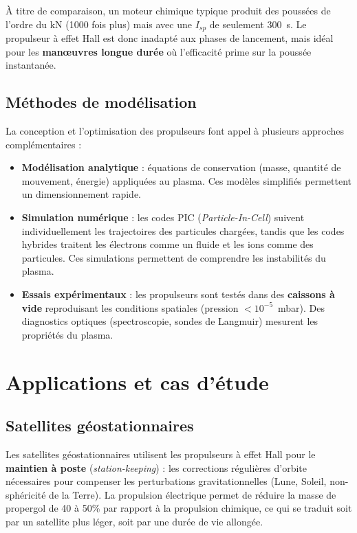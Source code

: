 \documentclass[12pt,a4paper]{article}
\begin{document}
À titre de comparaison, un moteur chimique typique produit des poussées de l'ordre du kN (1000 fois plus) mais avec une $I_{sp}$ de seulement 300~s. Le propulseur à effet Hall est donc inadapté aux phases de lancement, mais idéal pour les \textbf{manœuvres longue durée} où l'efficacité prime sur la poussée instantanée.

\subsection{Méthodes de modélisation}

La conception et l'optimisation des propulseurs font appel à plusieurs approches complémentaires :

\begin{itemize}
    \item \textbf{Modélisation analytique} : équations de conservation (masse, quantité de mouvement, énergie) appliquées au plasma. Ces modèles simplifiés permettent un dimensionnement rapide.
    \item \textbf{Simulation numérique} : les codes PIC (\textit{Particle-In-Cell}) suivent individuellement les trajectoires des particules chargées, tandis que les codes hybrides traitent les électrons comme un fluide et les ions comme des particules. Ces simulations permettent de comprendre les instabilités du plasma.
    \item \textbf{Essais expérimentaux} : les propulseurs sont testés dans des \textbf{caissons à vide} reproduisant les conditions spatiales (pression $< 10^{-5}$~mbar). Des diagnostics optiques (spectroscopie, sondes de Langmuir) mesurent les propriétés du plasma.
\end{itemize}

\section{Applications et cas d'étude}

\subsection{Satellites géostationnaires}

Les satellites géostationnaires utilisent les propulseurs à effet Hall pour le \textbf{maintien à poste} (\textit{station-keeping}) : les corrections régulières d'orbite nécessaires pour compenser les perturbations gravitationnelles (Lune, Soleil, non-sphéricité de la Terre). La propulsion électrique permet de réduire la masse de propergol de 40 à 50\% par rapport à la propulsion chimique, ce qui se traduit soit par un satellite plus léger, soit par une durée de vie allongée.
\end{document}
